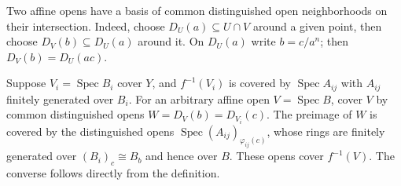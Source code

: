 Two affine opens have a basis of common distinguished open neighborhoods on their intersection. Indeed, choose $D_U(a)\subseteq U\cap V$ around a given point, then choose $D_V(b)\subseteq D_U(a)$ around it. On $D_U(a)$ write $b=c/a^n$; then $D_V(b)=D_U(ac)$.

Suppose $V_i=\operatorname{Spec}B_i$ cover $Y$, and $f^{-1}(V_i)$ is covered by $\operatorname{Spec}A_{ij}$ with $A_{ij}$ finitely generated over $B_i$. For an arbitrary affine open $V=\operatorname{Spec}B$, cover $V$ by common distinguished opens $W=D_V(b)=D_{V_i}(c)$. The preimage of $W$ is covered by the distinguished opens $\operatorname{Spec}(A_{ij})_{\varphi_{ij}(c)}$, whose rings are finitely generated over $(B_i)_c\cong B_b$ and hence over $B$. These opens cover $f^{-1}(V)$. The converse follows directly from the definition.
